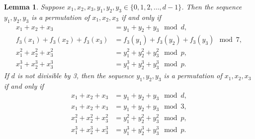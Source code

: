 \documentclass[aps,pra,twocolumn,nofootinbib,superscriptaddress,10pt]{revtex4-2}
\newtheorem{lemma}{Lemma}
\newcommand{\mmod}{\!\mod}
\begin{document}
\begin{lemma}\label{lem:DesignPermutation}
Suppose $x_1, x_2, x_3, y_1, y_2, y_3\in\{0,1,2,\ldots, d-1\}$. Then the sequence $y_1, y_2, y_3$ is a permutation of $x_1, x_2, x_3$ if and only if
\begin{equation}\label{eq:ModularCondition}
\begin{aligned}
     x_1+x_2+x_3&=y_1+y_2+y_3\mmod d,\\
f_3(x_1)+f_3(x_2)+f_3(x_3)&=f_3(y_1)+f_3(y_2)+f_3(y_3)\mmod 7,\\
x_1^2+x_2^2+x_3^2&=y_1^2+y_2^2+y_3^2\mmod p,\\
x_1^3+x_2^3+x_3^3&=y_1^3+y_2^3+y_3^3\mmod p.
\end{aligned}
\end{equation}
If $d$ is not divisible by 3, then the sequence $y_1, y_2, y_3$ is a permutation of $x_1, x_2, x_3$ if and only if
\begin{equation}\label{eq:ModularCondition2}
\begin{aligned}
     x_1+x_2+x_3&=y_1+y_2+y_3\mmod d,\\
x_1+x_2+x_3&=y_1+y_2+y_3\mmod 3,\\
x_1^2+x_2^2+x_3^2&=y_1^2+y_2^2+y_3^2\mmod p,\\
x_1^3+x_2^3+x_3^3&=y_1^3+y_2^3+y_3^3\mmod p.
\end{aligned}
\end{equation}
\end{lemma}
\end{document}
